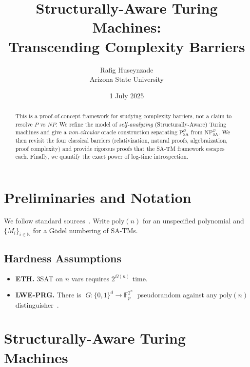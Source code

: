 \documentclass[12pt]{article}
\newcommand{\classP}{\mathrm{P}}
\newcommand{\classNP}{\mathrm{NP}}
\newcommand{\SA}{\mathrm{SA}}
\newcommand{\OO}{\mathcal{O}}
\newcommand{\poly}{\mathrm{poly}}
\newcommand{\F}{\mathbb{F}}
\theoremstyle{definition}
\theoremstyle{plain}
\begin{document}
\title{Structurally-Aware Turing Machines:\\Transcending Complexity Barriers}
\author{Rafig Huseynzade\\[1ex]\small Arizona State University}
\date{1 July 2025}
\maketitle

\begin{abstract}
This is a proof-of-concept framework for studying complexity barriers, 
not a claim to resolve \(P\) vs \(NP\).  
We refine the model of \emph{self-analyzing} (Structurally-Aware) Turing
machines and give a \emph{non-circular} oracle construction separating
\(\classP^{\OO}_{\SA}\) from \(\classNP^{\OO}_{\SA}\).  We then revisit
the four classical barriers (relativization, natural proofs,
algebraization, proof complexity) and provide rigorous proofs that the
SA-TM framework escapes each.  Finally, we quantify the exact power of
log-time introspection.
\end{abstract}

\tableofcontents

\section{Preliminaries and Notation}
We follow standard sources~\cite{AB09,Sip12}.  Write \(\poly(n)\) for an
unspecified polynomial and \(\{M_i\}_{i\in\mathbb N}\) for a G\"odel
numbering of SA-TMs.

\subsection{Hardness Assumptions}
\begin{itemize}
  \item \textbf{ETH.} 3SAT on \(n\) vars requires \(2^{\Omega(n)}\) time.
  \item \textbf{LWE-PRG.}  There is 
    \(\;G\colon\{0,1\}^d\to\F_p^{2^n}\;\)
    pseudorandom against any \(\poly(n)\) distinguisher~\cite{Albrecht17}.
\end{itemize}

\section{Structurally-Aware Turing Machines}
\end{document}
